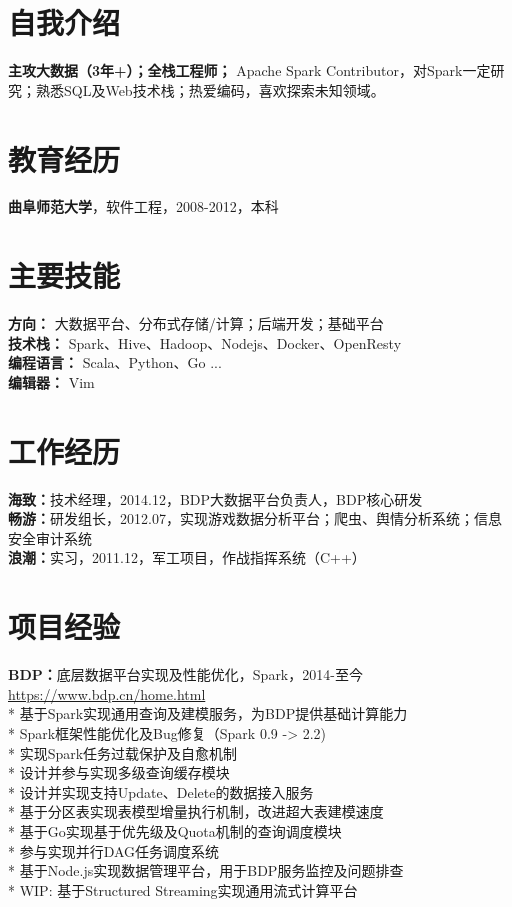 \documentclass[UTF8,margin,line]{res}
\begin{document}

\begin{resume}

\section{\sc 自我介绍}
\textbf{主攻大数据（3年+）；全栈工程师；} Apache Spark Contributor，对Spark一定研究；熟悉SQL及Web技术栈；热爱编码，喜欢探索未知领域。

\section{\sc 教育经历}
\textbf{曲阜师范大学}，软件工程，2008-2012，本科

\section{\sc 主要技能}
\textbf{方向：} 大数据平台、分布式存储/计算；后端开发；基础平台 \\
\textbf{技术栈：} Spark、Hive、Hadoop、Nodejs、Docker、OpenResty \\
\textbf{编程语言：} Scala、Python、Go ... \\
\textbf{编辑器：} Vim

\section{\sc 工作经历}
\textbf{海致：}技术经理，2014.12，BDP大数据平台负责人，BDP核心研发 \\
\textbf{畅游：}研发组长，2012.07，实现游戏数据分析平台；爬虫、舆情分析系统；信息安全审计系统 \\
\textbf{浪潮：}实习，2011.12，军工项目，作战指挥系统（C++）

\section{\sc 项目经验}
\textbf{BDP：}底层数据平台实现及性能优化，Spark，2014-至今 \url{https://www.bdp.cn/home.html} \\
* 基于Spark实现通用查询及建模服务，为BDP提供基础计算能力 \\
* Spark框架性能优化及Bug修复（Spark 0.9 -> 2.2) \\
* 实现Spark任务过载保护及自愈机制 \\
* 设计并参与实现多级查询缓存模块 \\
* 设计并实现支持Update、Delete的数据接入服务 \\
* 基于分区表实现表模型增量执行机制，改进超大表建模速度 \\
* 基于Go实现基于优先级及Quota机制的查询调度模块 \\
* 参与实现并行DAG任务调度系统 \\
* 基于Node.js实现数据管理平台，用于BDP服务监控及问题排查 \\
* WIP: 基于Structured Streaming实现通用流式计算平台 \\


\end{resume}
\end{document}
